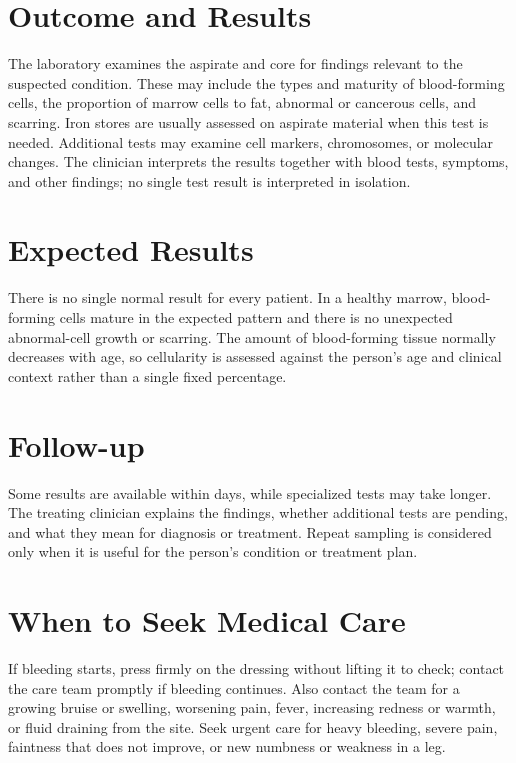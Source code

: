 \section*{Outcome and Results}
The laboratory examines the aspirate and core for findings relevant to the suspected condition. These may include the types and maturity of blood-forming cells, the proportion of marrow cells to fat, abnormal or cancerous cells, and scarring. Iron stores are usually assessed on aspirate material when this test is needed. Additional tests may examine cell markers, chromosomes, or molecular changes. The clinician interprets the results together with blood tests, symptoms, and other findings; no single test result is interpreted in isolation.

\section*{Expected Results}
There is no single normal result for every patient. In a healthy marrow, blood-forming cells mature in the expected pattern and there is no unexpected abnormal-cell growth or scarring. The amount of blood-forming tissue normally decreases with age, so cellularity is assessed against the person's age and clinical context rather than a single fixed percentage.

\section*{Follow-up}
Some results are available within days, while specialized tests may take longer. The treating clinician explains the findings, whether additional tests are pending, and what they mean for diagnosis or treatment. Repeat sampling is considered only when it is useful for the person's condition or treatment plan.

\section*{When to Seek Medical Care}
If bleeding starts, press firmly on the dressing without lifting it to check; contact the care team promptly if bleeding continues. Also contact the team for a growing bruise or swelling, worsening pain, fever, increasing redness or warmth, or fluid draining from the site. Seek urgent care for heavy bleeding, severe pain, faintness that does not improve, or new numbness or weakness in a leg.

